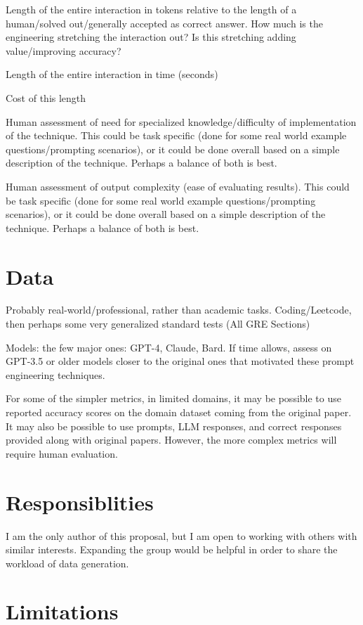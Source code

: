 \documentclass[11pt]{article}
\begin{document}
Length of the entire interaction in tokens relative to the length of a human/solved out/generally accepted as correct answer. How much is the engineering stretching the interaction out? Is this stretching adding value/improving accuracy?

Length of the entire interaction in time (seconds)

Cost of this length

Human assessment of need for specialized knowledge/difficulty of implementation of the technique. This could be task specific (done for some real world example questions/prompting scenarios), or it could be done overall based on a simple description of the technique. Perhaps a balance of both is best.

Human assessment of output complexity (ease of evaluating results). This could be task specific (done for some real world example questions/prompting scenarios), or it could be done overall based on a simple description of the technique. Perhaps a balance of both is best.

\section{Data}

Probably real-world/professional, rather than academic tasks. Coding/Leetcode, then perhaps some very generalized standard tests (All GRE Sections)

Models: the few major ones: GPT-4, Claude, Bard. If time allows, assess on GPT-3.5 or older models closer to the original ones that motivated these prompt engineering techniques.

For some of the simpler metrics, in limited domains, it may be possible to use reported accuracy scores on the domain dataset coming from the original paper. It may also be possible to use prompts, LLM responses, and correct responses provided along with original papers. However, the more complex metrics will require human evaluation.

\section{Responsiblities}

I am the only author of this proposal, but I am open to working with others with similar interests. Expanding the group would be helpful in order to share the workload of data generation.

\section*{Limitations}
\end{document}
